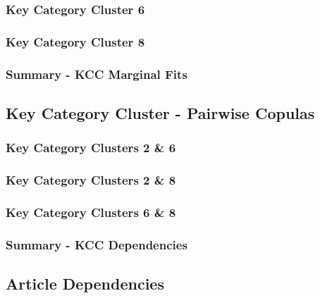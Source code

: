\documentclass[11pt, twoside]{article}
\numberwithin{equation}{section}
\numberwithin{table}{section}
\numberwithin{figure}{section}
\begin{document}
\subsubsection{Key Category Cluster 6} \label{sssec:margin_kcc_6}

\subsubsection{Key Category Cluster 8} \label{sssec:margin_kcc_8}

\subsubsection{Summary - KCC Marginal Fits} \label{sssec:margin_kcc_summary}


\subsection{Key Category Cluster - Pairwise Copulas}
\label{ssec:kcc_copulas}


%
\subsubsection{Key Category Clusters 2 \& 6} \label{sssec:kcc_26}

\subsubsection{Key Category Clusters 2 \& 8} \label{sssec:kcc_28}

\subsubsection{Key Category Clusters 6 \& 8} \label{sssec:kcc_68}

\subsubsection{Summary - KCC Dependencies} \label{sssec:kcc_pairs_summary}


\subsection{Article Dependencies} \label{ssec:article_dependencies}

\end{document}
